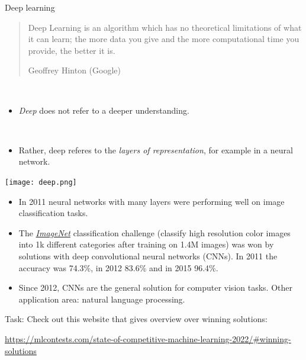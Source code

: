 \documentclass[
  10pt,
  ignorenonframetext,
  twocolumn]{beamer}
\providecommand{\tightlist}{%
  \setlength{\itemsep}{0pt}\setlength{\parskip}{0pt}}
\begin{document}
\begin{frame}
\begin{block}{Deep learning}
\label{deep-learning}
\(~\)

\begin{quote}
Deep Learning is an algorithm which has no theoretical limitations of what it can learn; the more data you give and the more computational time you provide, the better it is. 

Geoffrey Hinton (Google)
\end{quote}

\(~\)

\begin{itemize}
\tightlist
\item
  \emph{Deep} does not refer to a deeper understanding.
\end{itemize}

\(~\)

\begin{itemize}
\tightlist
\item
  Rather, deep referes to the \emph{layers of representation}, for
  example in a neural network.
\end{itemize}

\center

\texttt{[image: deep.png]}
\end{block}
\end{frame}

\begin{frame}
\begin{itemize}
\tightlist
\item
  In 2011 neural networks with many layers were performing well on image
  classification tasks.
\end{itemize}

\vspace{2mm}

\begin{itemize}
\tightlist
\item
  The \href{http://www.image-net.org/}{\emph{ImageNet}} classification
  challenge (classify high resolution color images into 1k different
  categories after training on 1.4M images) was won by solutions with
  deep convolutional neural networks (CNNs). In 2011 the accuracy was
  74.3\%, in 2012 83.6\% and in 2015 96.4\%.
\end{itemize}

\vspace{2mm}

\begin{itemize}
\tightlist
\item
  Since 2012, CNNs are the general solution for computer vision tasks.
  Other application area: natural language processing.
\end{itemize}

\vspace{2mm}

Task: Check out this website that gives overview over winning solutions:

\url{https://mlcontests.com/state-of-competitive-machine-learning-2022/\#winning-solutions}
\end{frame}
\end{document}
